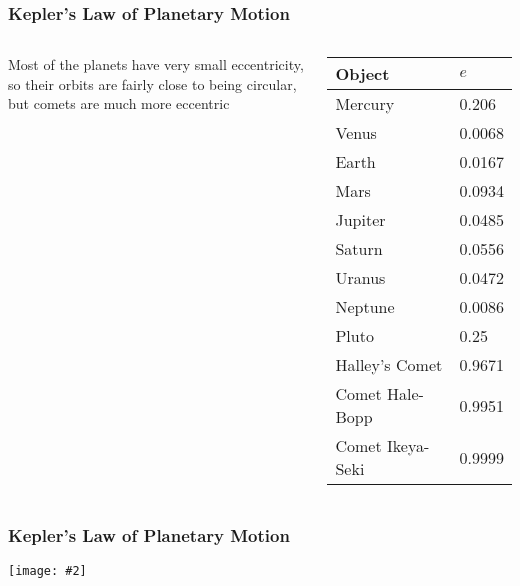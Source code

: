\documentclass[12pt,compress,aspectratio=169]{beamer}
\newcommand{\pic}[2]{\texttt{[image: \#2]}}
\begin{document}
\begin{frame}
  \frametitle{Kepler's Law of Planetary Motion}
  \begin{columns}
    Most of the planets have very small eccentricity, so their orbits are
    fairly close to being circular, but comets are much more eccentric

    \begin{tabular}{l|l}
      \rowcolor{pink}
      \textbf{Object} & $e$ \\ \hline
      Mercury	& \num{.206} \\
      Venus	& \num{.0068} \\
      Earth	& \num{.0167} \\
      Mars	& \num{.0934} \\
      Jupiter	& \num{.0485} \\
      Saturn	& \num{.0556} \\
      Uranus	& \num{.0472} \\
      Neptune	& \num{.0086} \\
      Pluto	& \num{.25} \\ \hline
      Halley's Comet   & \num{.9671} \\
      Comet Hale-Bopp  & \num{.9951} \\
      Comet Ikeya-Seki & \num{.9999}
    \end{tabular}
  \end{columns}
\end{frame}

\begin{frame}
  \frametitle{Kepler's Law of Planetary Motion}
  \begin{center}
    \pic{.4}{kep5.png}
  \end{center}
\end{frame}
\end{document}
